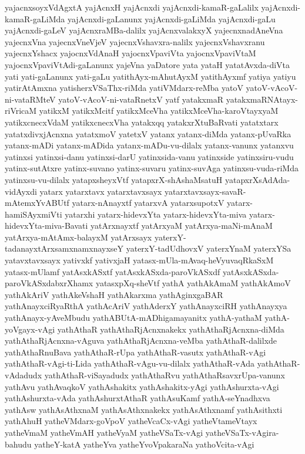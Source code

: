 {yajacnxsoyxVdAgxtA
yajAcnxH
yajAcnxdi
yajAcnxdi-kamaR-gaLalilx
yajAcnxdi-kamaR-gaLiMda
yajAcnxdi-gaLanunx
yajAcnxdi-gaLiMda
yajAcnxdi-gaLu
yajAcnxdi-gaLeV
yajAcnxraMBa-dalilx
yajAcnxvalakxyX
yajecnxnadAneVna
yajecnxVna
yajecnxVneVjeV
yajecnxVshavxra-nalilx
yajecnxVshavxranu
yajecnxYshacx
yajocnxVdAnaH
yajocnxVpaviVta
yajocnxVpaviVtaM
yajocnxVpaviVtAdi-gaLanunx
yajeVna
yaDatore
yata
yataH
yatatAvxda-diVta
yati
yati-gaLanunx
yati-gaLu
yatithAyx-mAhutAyxM
yatithAyxmf
yatiya
yatiyu
yatirAtAmxna
yatisherxVSaThx-riMda
yatiVMdarx-reMba
yatoV
yatoV-vAcoV-ni-vataRMteV
yatoV-vAcoV-ni-vataRnetxV
yatf
yatakxmaR
yatakxmaRNAtayx-riVricaM
yatikxM
yatikxMcitf
yatikxMceVha
yatikxMceVha-karoVtayxyaM
yatikxcnecxVdaM
yatikxcnecxVha
yatakxqq
yatakxrXtuBaRvati
yatatxtarx
yatatxdivxjAcnxna
yatatxmoV
yatetxV
yatanx
yatanx-diMda
yatanx-pUvaRka
yatanx-mADi
yatanx-mADida
yatanx-mADu-vu-dilalx
yatanx-vanunx
yatanxvu
yatinxsi
yatinxsi-danu
yatinxsi-darU
yatinxsida-vanu
yatinxside
yatinxsiru-vudu
yatinx-sutAtxre
yatinx-suvano
yatinx-suvaru
yatinx-suvAga
yatinxsu-vuda-riMda
yatinxsu-vu-dilalx
yatapxsheyxVtf
yatapxrX-shAshaMsatuH
yatapxrXsAdAda-vidAyxdi
yatarx
yatarxtavx
yatarxtavxsayx
yatarxtavxsayx-savaR-mAtemxYvABUtf
yatarx-nAnayxtf
yatarxvA
yatarxsupotxV
yatarx-hamiSAyxmiVti
yatarxhi
yatarx-hidevxYta
yatarx-hidevxYta-miva
yatarx-hidevxYta-miva-Bavati
yatArxnayxtf
yatArxyaM
yatArxya-maNi-mAnaM
yatArxya-mAtAmx-balayxM
yatArxsayx
yaterxY-tadanayxtArxsamxnamxnayxseY
yaterxY-tadUdhovxV
yaterxYnaM
yaterxYSa
yatavxtavxsayx
yativxkf
yativxjaH
yatasx-mUla-mAvaq-heVyuvaqRkaSxM
yatasx-mUlamf
yatAsxkASxtf
yatAsxkASxda-paroVkASxdf
yatAsxkASxda-paroVkASxdabxrXhamx
yatasxpXq-sheVtf
yathA
yathAkAmaM
yathAkAmoV
yathAkAriV
yathAkeVshaH
yathAkarxma
yathAginxgaBAR
yathAnayxciRyaRthA
yathAcAriV
yathAderxY
yathAnayxciRH
yathAnayxya
yathAnayx-yAveMbudu
yathABUtA-mADhigamayanitx
yathA-yathaM
yathA-yoVgayx-vAgi
yathAthaR
yathAthaRjAcnxnakekx
yathAthaRjAcnxna-diMda
yathAthaRjAcnxna-vAguva
yathAthaRjAcnxna-veMba
yathAthaR-dalilxde
yathAthaRnuBava
yathAthaR-rUpa
yathAthaR-vasutx
yathAthaR-vAgi
yathAthaR-vAgi-ti-Lida
yathAthaR-vAgu-vu-dilalx
yathAthaR-vAda
yathAthaR-vAdadudx
yathAthaR-viSayadudx
yathAthaRvu
yathAthaRsavxrUpa-vanunx
yathAvu
yathAvaqkoV
yathAshakitx
yathAshakitx-yAgi
yathAshurxta-vAgi
yathAshurxta-vAda
yathAshurxtAthaR
yathAsuKamf
yathA-seYnadhxva
yathAsw
yathAsAthxnaM
yathAsAthxnakekx
yathAsAthxnamf
yathAsithxti
yathAhuH
yatheVMdarx-goVpoV
yatheVcaCx-vAgi
yatheVtameVtayx
yatheVmaM
yatheVmAH
yatheVyaM
yatheVSaTx-vAgi
yatheVSaTx-vAgira-bahudu
yatheY-katA
yatheYva
yatheYvoVpakaraNa
yathoVcita-vAgi
}
